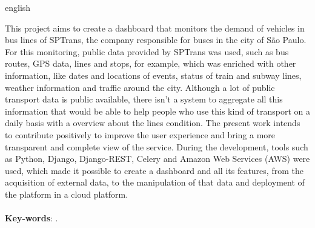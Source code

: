 \begin{resumo}[Abstract]
	\begin{otherlanguage*}{english}
	\indent
	\par This project aims to create a dashboard that monitors the demand of vehicles in bus lines of SPTrans, the company responsible for buses in the city of São Paulo. For this monitoring, public data provided by SPTrans was used, such as bus routes, GPS data, lines and stops, for example, which was enriched with other information, like dates and locations of events, status of train and subway lines, weather information and traffic around the city. Although a lot of public transport data is public available, there isn’t a system to aggregate all this information that would be able to help people who use this kind of transport on a daily basis with a overview about the lines condition. The present work intends to contribute positively to improve the user experience and bring a more transparent and complete view of the service. During the development, tools such as Python, Django, Django-REST, Celery and Amazon Web Services (AWS) were used, which made it possible to create a dashboard and all its features, from the acquisition of external data, to the manipulation of that data and deployment of the platform in a cloud platform.
	\\
	\\
	\textbf{Key-words}: \KeyWordA.~
	\end{otherlanguage*}
\end{resumo}
